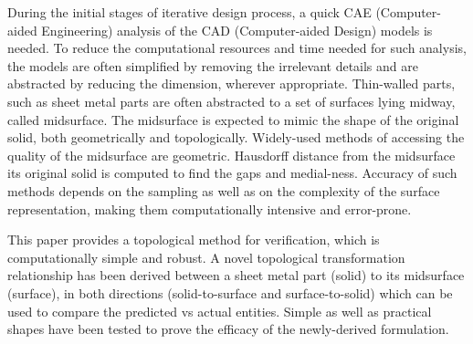 During the initial stages of iterative design process, a quick CAE (Computer-aided Engineering) analysis of the CAD (Computer-aided Design) models is needed. To reduce the computational resources and time needed for such analysis, the models are often simplified by removing the irrelevant details and are abstracted by reducing the dimension, wherever appropriate. Thin-walled parts, such as sheet metal parts are often abstracted to a set of surfaces lying midway, called midsurface. The midsurface is expected to mimic the shape of the original solid, both geometrically and topologically. Widely-used methods of accessing the quality of the midsurface are geometric. Hausdorff distance from the midsurface its original solid is computed to find the gaps and medial-ness. Accuracy of such methods depends on the sampling as well as on the complexity of the surface representation, making them computationally intensive and error-prone.

This paper provides a topological method for verification, which is computationally simple and robust. A novel topological transformation relationship has been derived between a sheet metal part (solid) to its midsurface (surface), in both directions (solid-to-surface and surface-to-solid) which can be used to compare the predicted vs actual entities. Simple as well as practical shapes have been tested to prove the efficacy of the newly-derived formulation.
